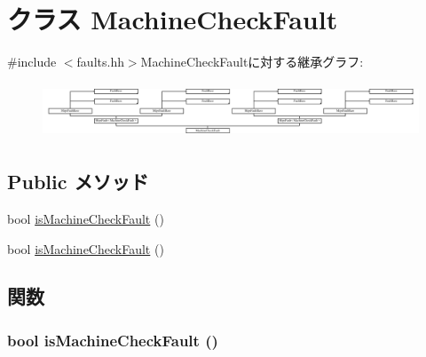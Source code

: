 \hypertarget{classMipsISA_1_1MachineCheckFault}{
\section{クラス MachineCheckFault}
\label{classMipsISA_1_1MachineCheckFault}
}


{\ttfamily \#include $<$faults.hh$>$}MachineCheckFaultに対する継承グラフ:\begin{figure}[H]
\begin{center}
\leavevmode
\includegraphics[height=1.65094cm]{classMipsISA_1_1MachineCheckFault}
\end{center}
\end{figure}
\subsection*{Public メソッド}
\begin{DoxyCompactItemize}
\item 
bool \hyperlink{classMipsISA_1_1MachineCheckFault_aeb744a50ac5af95578632b1024bded5e}{isMachineCheckFault} ()
\item 
bool \hyperlink{classMipsISA_1_1MachineCheckFault_aeb744a50ac5af95578632b1024bded5e}{isMachineCheckFault} ()
\end{DoxyCompactItemize}


\subsection{関数}
\hypertarget{classMipsISA_1_1MachineCheckFault_aeb744a50ac5af95578632b1024bded5e}{
\subsubsection[{isMachineCheckFault}]{\setlength{\rightskip}{0pt plus 5cm}bool isMachineCheckFault ()}}
\label{classMipsISA_1_1MachineCheckFault_aeb744a50ac5af95578632b1024bded5e}




